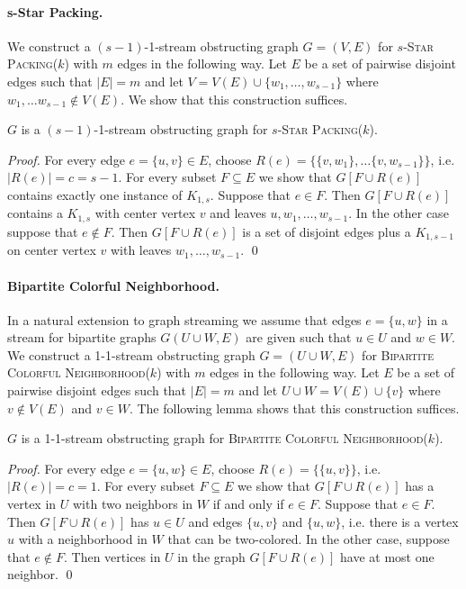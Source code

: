 \documentclass[draft,a4paper]{llncs}
\newcommand{\BCNk}{\textsc{Bipartite Colorful Neighborhood($k$)}\xspace}
\newcommand{\sSPk}{$s$-\textsc{Star Packing($k$)}\xspace}
\begin{document}
\paragraph{s-Star Packing.}
We construct a $(s-1)$-1-stream obstructing graph $G = (V,E)$ for \sSPk with $m$ edges in the following way. Let $E$ be a set of pairwise disjoint edges such that $|E| = m$ and let $V = V(E) \cup \{w_1, \ldots, w_{s-1}\}$ where $w_1, \ldots w_{s-1} \notin V(E)$. We show that this construction suffices.

\begin{lemma}
 $G$ is a $(s-1)$-1-stream obstructing graph for \sSPk.
\end{lemma}

\begin{proof}
For every edge $e = \{u, v\} \in E$, choose $R(e) = \{\{v,w_1\},\ldots\{v,w_{s-1}\}\}$, i.e. $|R(e)| = c = s-1$. For every subset $F \subseteq E$ we show that $G[F\cup R(e)]$ contains exactly one instance of $K_{1,s}$. Suppose that $e \in F$. Then $G[F\cup R(e)]$ contains a $K_{1,s}$ with center vertex $v$ and leaves $u, w_1, \ldots, w_{s-1}$. In the other case suppose that $e \notin F$. Then $G[F\cup R(e)]$ is a set of disjoint edges plus a $K_{1,s-1}$ on center vertex $v$ with leaves $w_1, \ldots, w_{s-1}$. \qed
\end{proof}

\paragraph{Bipartite Colorful Neighborhood.}
In a natural extension to graph streaming we assume that edges $e = \{u, w\}$ in a stream for bipartite graphs $G(U \cup W,E)$ are given such that $u \in U$ and $w \in W$. We construct a 1-1-stream obstructing graph $G = (U \cup W,E)$ for \BCNk with $m$ edges in the following way. Let $E$ be a set of pairwise disjoint edges such that $|E| = m$ and let $U \cup W = V(E) \cup \{v\}$ where $v \notin V(E)$ and $v \in W$. The following lemma shows that this construction suffices.

\begin{lemma}
 $G$ is a 1-1-stream obstructing graph for \BCNk.
\end{lemma}

\begin{proof}
 For every edge $e = \{u, w\} \in E$, choose $R(e) = \{\{u, v\}\}$, i.e. $|R(e)| = c = 1$. For every subset $F \subseteq E$ we show that $G[F \cup R(e)]$ has a vertex in $U$ with two neighbors in $W$ if and only if $e \in F$. Suppose that $e \in F$. Then $G[F \cup R(e)]$ has $u \in U$ and edges $\{u, v\}$ and $\{u, w\}$, i.e. there is a vertex $u$ with a neighborhood in $W$ that can be two-colored. In the other case, suppose that $e \notin F$. Then vertices in $U$ in the graph $G[F\cup R(e)]$ have at most one neighbor.
 \qed
\end{proof}
\end{document}
